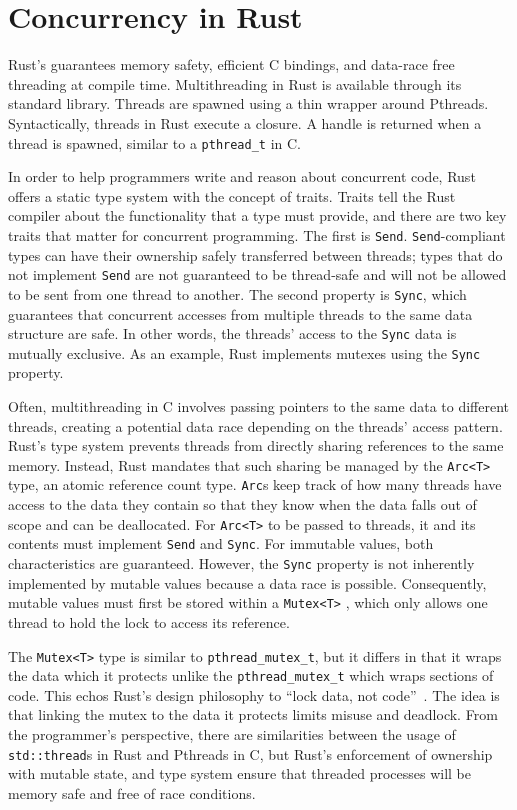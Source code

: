 \section{Concurrency in Rust}\label{sec::rust_concurrency}
Rust's guarantees memory safety, efficient C bindings, and data-race free threading at compile time. Multithreading in Rust is available through its standard library. Threads are spawned using a thin wrapper around Pthreads. Syntactically, threads in Rust execute a closure. A handle is returned when a thread is spawned, similar to a \texttt{pthread\_t} in C.

In order to help programmers write and reason about concurrent code, Rust offers a static type system with the concept of traits. Traits tell the Rust compiler about the functionality that a type must provide, and there are two key traits that matter for concurrent programming. The first is \texttt{Send}. \texttt{Send}-compliant types can have their ownership safely transferred between threads; types that do not implement \texttt{Send} are not guaranteed to be thread-safe and will not be allowed to be sent from one thread to another. The second property is \texttt{Sync}, which guarantees that concurrent accesses from multiple threads to the same data structure are safe. In other words, the threads' access to the \texttt{Sync} data is mutually exclusive. As an example, Rust implements mutexes using the \texttt{Sync} property.

Often, multithreading in C involves passing pointers to the same data to different threads, creating a potential data race depending on the threads' access pattern. Rust's type system prevents threads from directly sharing references to the same memory. Instead, Rust mandates that such sharing be managed by the \texttt{Arc<T>} type, an atomic reference count type. \texttt{Arc}s keep track of how many threads have access to the data they contain so that they know when the data falls out of scope and can be deallocated. For \texttt{Arc<T>} to be passed to threads, it and its contents must implement \texttt{Send} and \texttt{Sync}. For immutable values, both characteristics are guaranteed. However, the \texttt{Sync} property is not inherently implemented by mutable values because a data race is possible. Consequently, mutable values must first be stored within a \texttt{Mutex<T>} , which only allows one thread to hold the lock to access its reference.

The \texttt{Mutex<T>} type is similar to \texttt{pthread\_mutex\_t}, but it differs in that it wraps the data which it protects unlike the \texttt{pthread\_mutex\_t} which wraps sections of code. This echos Rust's design philosophy to ``lock data, not code''~\cite{rust-lang}. The idea is that linking the mutex to the data it protects limits misuse and deadlock. From the programmer's perspective, there are similarities between the usage of \texttt{std::thread}s in Rust and Pthreads in C, but Rust's enforcement of ownership with mutable state, and type system ensure that threaded processes will be memory safe and free of race conditions.